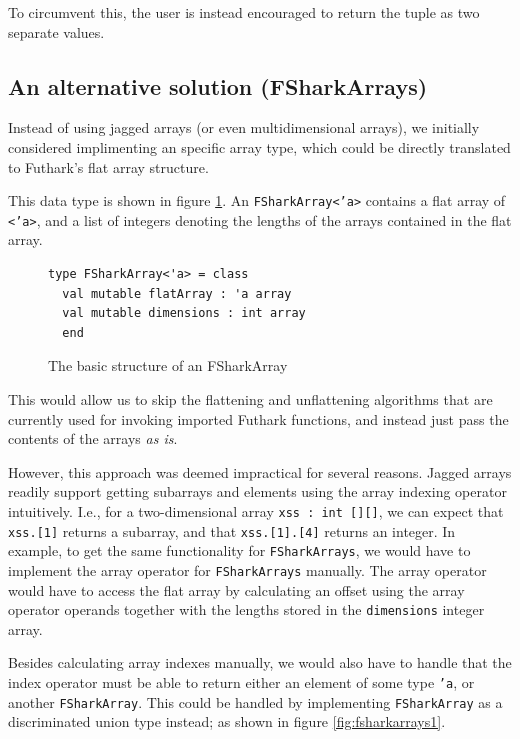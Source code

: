To circumvent this, the user is instead encouraged to return the tuple as two
separate values.

\subsection{An alternative solution (FSharkArrays)}
Instead of using jagged arrays (or even multidimensional arrays), we initially
considered implimenting an \fshark{} specific array type, which could be directly
translated to Futhark's flat array structure.

This data type is shown in figure \ref{fig:fsharkarrays0}.
An {\tt FSharkArray<'a>} contains a flat array of {\tt <'a>}, and a list of integers
denoting the lengths of the arrays contained in the flat array.

\begin{figure}[H]
  \centering
\begin{verbatim}
type FSharkArray<'a> = class
  val mutable flatArray : 'a array 
  val mutable dimensions : int array
  end
\end{verbatim}
  \caption{The basic structure of an FSharkArray}
  \label{fig:fsharkarrays0}
\end{figure}

This would allow us to skip the flattening and unflattening algorithms that are
currently used for invoking imported Futhark functions, and instead just pass
the contents of the arrays \textit{as is}.

However, this approach was deemed impractical for several reasons.
Jagged arrays readily support getting subarrays and elements using the array
indexing operator intuitively. I.e., for a two-dimensional array \texttt{xss :
  int [][]}, we can expect that \texttt{xss.[1]} returns a subarray, and that \texttt{xss.[1].[4]}
returns an integer. 
In example, to get the same functionality for \texttt{FSharkArrays}, we would have to implement the
array operator for \texttt{FSharkArrays} manually. The array operator would have
to access the flat array by calculating an offset using the array operator
operands together with the lengths stored in the \texttt{dimensions} integer
array.

Besides calculating array indexes manually, we would also have to handle that
the index operator must be able to return either an element of some type
\texttt{'a}, or another \texttt{FSharkArray}. This could be handled by
implementing \texttt{FSharkArray} as a discriminated union type instead; as
shown in figure \ref{fig:fsharkarrays1}.

